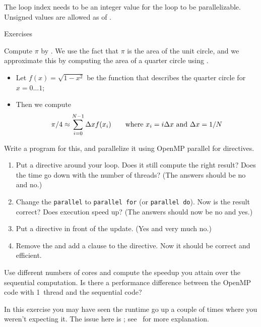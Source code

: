 \begin{remark}
  The loop index needs to be an integer value
  for the loop to be parallelizable.
  Unsigned values are allowed as of .
\end{remark}

 {Exercises}

\begin{exercise}
  \label{ex:omp-pi}
  Compute $\pi$ by . We use the fact that $\pi$
  is the area of the unit circle, and we approximate this by computing
  the area of a quarter circle using .
  \begin{itemize}
  \item Let $f(x)=\sqrt{1-x^2}$ be the function that describes the
    quarter circle for $x=0\ldots 1$;
  \item Then we compute \[ \pi/4\approx\sum_{i=0}^{N-1} \Delta x
    f(x_i) \qquad \hbox{where $x_i=i\Delta x$ and $\Delta x=1/N$} \]
  \end{itemize}
  Write a program for this, and parallelize it using OpenMP parallel
  for directives.
  \begin{enumerate}
  \item Put a  directive around your loop. Does it still
    compute the right result? Does the time go down with the number of
    threads? (The answers should be no and no.)
  \item Change the \lstinline{parallel} to \lstinline{parallel for}
    (or \lstinline{parallel do}). Now is the result correct? Does execution speed up? (The
    answers should now be no and yes.)
  \item Put a  directive in front of the update. (Yes and
    very much no.)
  \item Remove the  and add a clause
     to the  directive.
    Now it should be correct and efficient.
  \end{enumerate}
  Use different numbers of cores and compute the
  speedup you attain over the sequential computation. Is there a
  performance difference between the OpenMP code with 1~thread and the
  sequential code?
\end{exercise}

\begin{remark}
  In this exercise you may have seen the runtime go up a couple of times
  where you weren't expecting it. The issue here is ; see~ for more explanation.
\end{remark}

